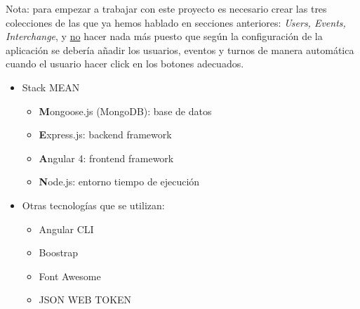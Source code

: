 Nota: para empezar a trabajar con este proyecto es necesario crear las tres colecciones de las que ya hemos hablado en secciones anteriores: \emph{Users, Events, Interchange}, y \underline{no} hacer nada más puesto que según la configuración de la aplicación se debería añadir los usuarios, eventos y turnos de manera automática cuando el usuario hacer click en los botones adecuados. 


\begin{itemize}
  \item Stack MEAN
  \begin{itemize}
    \item \textbf{M}ongoose.js (MongoDB):  base de datos
    \item \textbf{E}xpress.js: backend framework
    \item \textbf{A}ngular 4: frontend framework
    \item \textbf{N}ode.js: entorno tiempo de ejecución
  \end{itemize}
  \item Otras tecnologías que se utilizan:
  \begin{itemize}
    \item Angular CLI
    \item Boostrap
    \item Font Awesome
    \item JSON WEB TOKEN
  \end{itemize}
\end{itemize}




